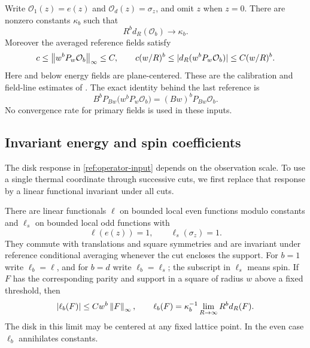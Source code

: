 Write $\mathcal O_1(z)=e(z)$ and $\mathcal O_d(z)=\sigma_z$,
and omit $z$ when $z=0$.  There are nonzero
constants $\kappa_b$ such that
\begin{equation}\label{ref:calibration}
 R^b d_R(\mathcal O_b)\longrightarrow\kappa_b.
\end{equation}
Moreover the averaged reference fields satisfy
\begin{equation}\label{ref:line-norms}
 c\le\left\lVert w^bP_w\mathcal O_b\right\rVert_\infty\le C,
 \qquad
 c(w/R)^b\le |d_R(w^bP_w\mathcal O_b)|\le C(w/R)^b.
\end{equation}
Here and below energy fields are plane-centered.  These are the calibration
and field-line estimates of
\cite[Lemmas~4.5 and~5.3 and Equation~(5.18)]{ReferenceIsing}.  The exact identity
behind the last reference is
\begin{equation}\label{ref:exact-line}
 B^bP_{Bw}\bigl(w^bP_w\mathcal O_b\bigr)
          =(Bw)^bP_{Bw}\mathcal O_b.
\end{equation}
No convergence rate for primary fields is used in these inputs.

\subsection{Invariant energy and spin coefficients}

The disk response in \eqref{ref:operator-input} depends on the observation
scale.  To use a single thermal coordinate through successive cuts, we first
replace that response by a linear functional invariant under all cuts.

\begin{lemma}\label{ref:charges}
There are linear functionals $\ell$ on bounded local even functions modulo
constants and $\ell_s$ on bounded local odd functions with
\[
 \ell(e(z))=1,\qquad \ell_s(\sigma_z)=1.
\]
They commute with translations and square symmetries and are invariant under
reference conditional averaging whenever the cut encloses the support.
For $b=1$ write $\ell_b=\ell$, and for $b=d$ write $\ell_b=\ell_s$; the subscript in
$\ell_s$ means spin.  If $F$ has the corresponding parity and support in a
square of radius $w$ above a fixed threshold, then
\begin{equation}\label{ref:charge-bound}
 |\ell_b(F)|\le Cw^b\left\lVert F\right\rVert_\infty,
 \qquad
 \ell_b(F)=\kappa_b^{-1}\lim_{R\to\infty}R^b d_R(F).
\end{equation}
The disk in this limit may be centered at any fixed lattice point.  In the
even case $\ell_b$ annihilates constants.
\end{lemma}

